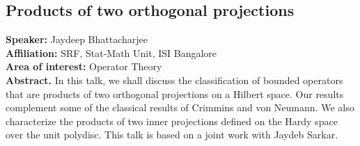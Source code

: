 
\subsection*{Products of two orthogonal projections} %
\noindent
\textbf{Speaker:} Jaydeep Bhattacharjee\\ %
\textbf{Affiliation:} SRF, Stat-Math Unit, ISI Bangalore \\ %
\textbf{Area of interest:} Operator Theory \\

\noindent\textbf{Abstract.} In this talk, we shall discuss the classification of bounded operators that are products of two orthogonal projections on a Hilbert space. Our results complement some of the classical results of Crimmins and von Neumann. We also characterize the products of two inner projections defined on the Hardy space over the unit polydisc. This talk is based on a joint work with Jaydeb Sarkar.

